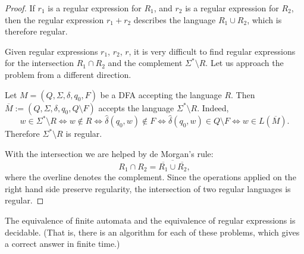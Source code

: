 \begin{page}
\setcounter{section}{3}
\setcounter{subsection}{1}
\setcounter{dfn}{1}
\label{portion:989}

\begin{proof}
If $r_1$ is a regular expression for $R_1$, and $r_2$ is a regular expression for $R_2$,
then the regular expression $r_1 + r_2$ describes the language $R_1 \cup R_2$, which is therefore regular.

Given regular expressions $r_1$, $r_2$, $r$,
it is very difficult to find regular expressions for the intersection $R_1 \cap R_2$ and the complement $\Sigma^* \setminus R$.
Let us approach the problem from a different direction.

Let $M = (Q, \Sigma, \delta, q_0, F)$ be a DFA accepting the language $R$.
Then $\overline{M} := (Q, \Sigma, \delta, q_0, Q \setminus F)$ accepts the language $\Sigma^* \setminus R$.
Indeed,
\[
w \in \Sigma^* \setminus R \Leftrightarrow w \notin R \Leftrightarrow \widehat{\delta}(q_0, w) \notin F
\Leftrightarrow \widehat{\delta}(q_0, w) \in Q \setminus F \Leftrightarrow w \in L(\overline{M}).
\]
Therefore $\Sigma^* \setminus R$ is regular.

With the intersection we are helped by de Morgan's rule:
\[
R_1 \cap R_2 = \overline{\overline{R_1} \cup \overline{R_2}},
\]
where the overline denotes the complement.
Since the operations applied on the right hand side preserve regularity, the intersection of two regular languages is regular.
\end{proof}



\end{page}

\begin{page}
\setcounter{section}{3}
\setcounter{subsection}{1}
\setcounter{dfn}{2}
\label{portion:991}

\begin{thm}
The equivalence of finite automata and the equivalence of regular expressions is decidable.
(That is, there is an algorithm for each of these problems, which gives a correct answer in finite time.)
\end{thm}

\end{page}

